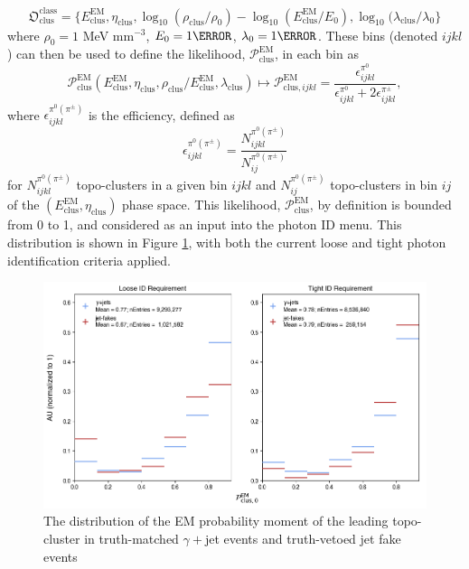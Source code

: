 \begin{equation}
    \mathfrak{O}_{\text{clus}}^{\text{class}} = \{
        E_{\text{clus}}^{\text{EM}},
        \eta_{\text{clus}},
        \log_{10}(\rho_{\text{clus}} / \rho_{\text{0}}) - \log_{10}(E_{\text{clus}}^{\text{EM}} / E_{\text{0}}),
        \log_{10}(\lambda_{\text{clus}} / \lambda_{\text{0}}
    \}
\end{equation}
where $\rho_0 = 1$ MeV mm$^{-3}$, $E_0 = \unit{1}{\MeV}$, $\lambda_{0} = \unit{1}{\mm}$. These bins (denoted $ijkl$) can then be used to define the likelihood, $ \mathcal{P}_{\text{clus}}^{\text{EM}}$, in each bin as
\begin{equation}
    \mathcal{P}_{\text{clus}}^{\text{EM}} ( E_{\text{clus}}^{\text{EM}}, \eta_{\text{clus}}, \rho_{\text{clus}} / E_{\text{clus}}^{\text{EM}}, \lambda_{\text{clus}}) \mapsto \mathcal{P}_{\text{clus}, ijkl}^{\text{EM}}  = \frac{\epsilon^{\pi^0}_{ijkl}}{ \epsilon^{\pi^0}_{ijkl} + 2\epsilon^{\pi^\pm}_{ijkl}},
\end{equation}
where $\epsilon^{\pi^0(\pi^\pm)}_{ijkl}$ is the efficiency, defined as
\begin{equation}
    \epsilon^{\pi^0(\pi^\pm)}_{ijkl} = \frac{ N^{\pi^0(\pi^\pm)}_{ijkl} }{N^{\pi^0(\pi^\pm)}_{ij}}
\end{equation}
for $N^{\pi^0(\pi^\pm)}_{ijkl}$ topo-clusters in a given bin $ijkl$ and $N^{\pi^0(\pi^\pm)}_{ij}$ topo-clusters in bin $ij$ of the $(E_{\text{clus}}^{\text{EM}}, \eta_{\text{clus}})$ phase space. This likelihood, $\mathcal{P}_{\text{clus}}^{\text{EM}}$, by definition is bounded from 0 to 1, and considered as an input into the photon ID menu. This distribution is shown in Figure \ref{fig:topo-emProb}, with both the current loose and tight photon identification criteria applied.

\begin{figure}[htb]
    \centering 
    \includegraphics[width=\textwidth]{chapters/chapter4_photonID/images/hists/y_topoCluster0_emProbability.png}
    \caption[The distribution of the \gls{EM} probability moment of the leading topo-cluster]{The distribution of the \gls{EM} probability moment of the leading topo-cluster in truth-matched $\gamma+$jet events and truth-vetoed jet fake events}
    \label{fig:topo-emProb}
\end{figure}


